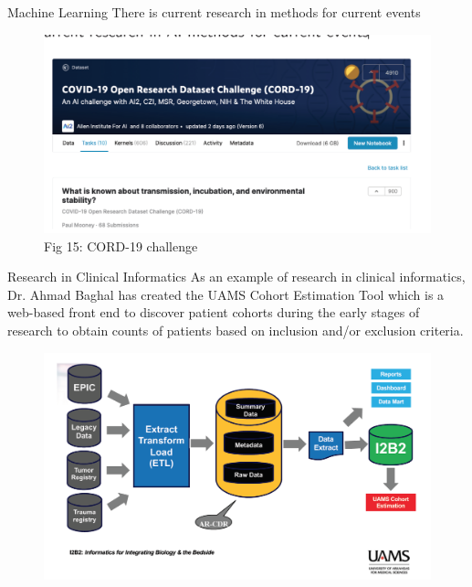 \documentclass[11pt, aspectratio=43]{beamer}
\begin{document}
	\begin{frame}{Machine Learning}
		There is current research in methods for current events
		\begin{figure}[h]
			\centering
			\includegraphics[scale=0.45]{Figures/covid.png}
			\caption{Fig 15: CORD-19 challenge}
		\end{figure}
	\end{frame}
	
	\begin{frame}{Research in Clinical Informatics}
		As an example of research in clinical informatics, Dr. Ahmad Baghal has
		created the UAMS Cohort Estimation Tool which is a web-based front end
		to discover patient cohorts during the early stages of research to obtain
		counts of patients based on inclusion and/or exclusion criteria.
		\begin{figure}[h]
			\centering
			\includegraphics[scale=0.45]{Figures/baghal.png}
		\end{figure}
	\end{frame}
	
\end{document}

